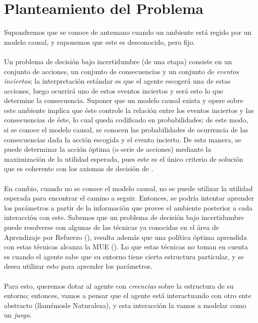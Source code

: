 \documentclass[11pt]{article}
\theoremstyle{plain}
\begin{document}
\section{Planteamiento del Problema}
Supondremos que se conoce de antemano cuando un ambiente está regido por un modelo causal, y suponemos que este es desconocido, pero fijo.\\
\\
Un problema de decisión bajo incertidumbre (de una etapa) consiste en un conjunto de acciones, un conjunto de consecuencias y un conjunto de \textit{eventos inciertos}; la interpretación estándar es que el agente escogerá una de estas acciones, luego ocurrirá uno de estos eventos inciertos y será esto lo que determine la consecuencia. Suponer que un modelo causal exista y opere sobre este ambiente implica que éste controle la relación entre los eventos inciertos y las consecuencias de éste, lo cual queda codificado en probabilidades; de este modo, si se conoce el modelo causal, se conocen las probabilidades de ocurrencia de las consecuencias dada la acción escogida y el evento incierto. De esta manera, se puede determinar la acción óptima (o serie de acciones) mediante la maximización de la utilidad esperada, pues este es el único criterio de solución que es coherente con los axiomas de decisión de \cite{savage1954the}.\\
\\
En cambio, cuando no se conoce el modelo causal, no se puede utilizar la utilidad esperada para encontrar el camino a seguir. Entonces, se podría intentar aprender los parámetros a partir de la información que provee el ambiente posterior a cada interacción con este. Sabemos que un problema de decisión bajo incertidumbre puede resolverse con algunas de las técnicas ya conocidas en el área de Aprendizaje por Refuerzo (\cite{sutton1998reinforcement}), resulta además que una política óptima aprendida con estas técnicas alcanza la MUE (\cite{webb2007game}). Lo que estas técnicas no toman en cuenta es cuando el agente sabe que su entorno tiene cierta estructura particular, y se desea utilizar esto para aprender los parámetros.\\
\\
Para esto, queremos dotar al agente con \textit{creencias} sobre la estructura de su entorno; entonces, vamos a pensar que el agente está interactuando con otro ente abstracto (llamémosle Naturaleza), y esta interacción la vamos a modelar como un \textit{juego}.\\
\\
\end{document}
